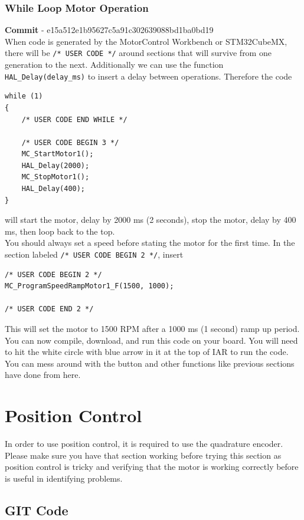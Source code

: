 \documentclass[10pt]{article}
\begin{document}
			\FloatBarrier \subsubsection{While Loop Motor Operation}
                \textbf{Commit} - e15a512e1b95627c5a91c302639088bd1ba0bd19 \\
                When code is generated by the MotorControl Workbench or STM32CubeMX, there will be \texttt{/* USER CODE */} around sections that will survive from one generation to the next. Additionally we can use the function \texttt{HAL\_Delay(delay\_ms)} to insert a delay between operations. Therefore the code 
                \begin{verbatim}
while (1)
{
    /* USER CODE END WHILE */

    /* USER CODE BEGIN 3 */
    MC_StartMotor1();
    HAL_Delay(2000);
    MC_StopMotor1();
    HAL_Delay(400);
}
                \end{verbatim}
                will start the motor, delay by 2000 ms (2 seconds), stop the motor, delay by 400 ms, then loop back to the top. \\ 
                You should always set a speed before stating the motor for the first time. In the section labeled \texttt{/* USER CODE BEGIN 2 */}, insert
                \begin{verbatim}
/* USER CODE BEGIN 2 */
MC_ProgramSpeedRampMotor1_F(1500, 1000);

/* USER CODE END 2 */
                \end{verbatim}
                 This will set the motor to 1500 RPM after a 1000 ms (1 second) ramp up period. You can now compile, download, and run this code on your board. You will need to hit the white circle with blue arrow in it at the top of IAR to run the code. You can mess around with the button and other functions like previous sections have done from here. 
	\FloatBarrier \section{Position Control}
    In order to use position control, it is required to use the quadrature encoder. Please make sure you have that section working before trying this section as position control is tricky and verifying that the motor is working correctly before is useful in identifying problems.
		\FloatBarrier \subsection{GIT Code}
\end{document}
